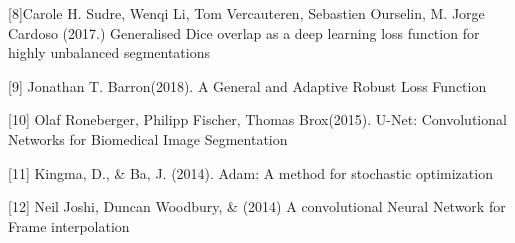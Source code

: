 \documentclass{article}
\begin{document}
[8]Carole H. Sudre, Wenqi Li, Tom Vercauteren, Sebastien Ourselin, M. Jorge Cardoso (2017.)
Generalised Dice overlap as a deep learning loss
function for highly unbalanced segmentations

[9] Jonathan T. Barron(2018).
A General and Adaptive Robust Loss Function

[10] Olaf Roneberger, Philipp Fischer, Thomas Brox(2015).
U-Net: Convolutional Networks for Biomedical Image Segmentation

[11] Kingma, D., \& Ba, J. (2014). Adam: A method for stochastic
optimization

[12] Neil Joshi, Duncan Woodbury, \&  (2014) A convolutional Neural Network for Frame interpolation
\end{document}
